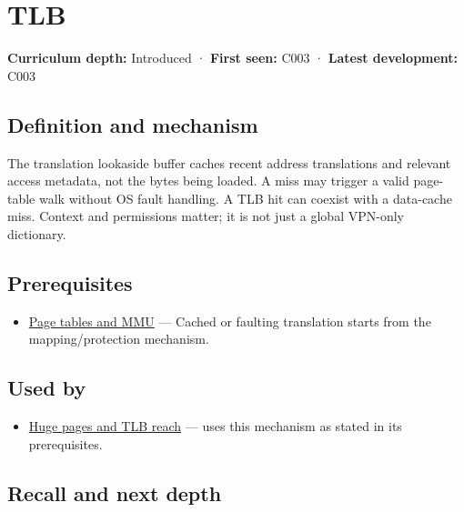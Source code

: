 \hypertarget{appendix-7a2d9c5ce511}{}\label{referencestart:appendix-7a2d9c5ce511}
\section{TLB}\label{appendix-7a2d9c5ce511-tlb}

\textbf{Curriculum depth:} Introduced · \textbf{First seen:} C003 · \textbf{Latest development:} C003

\subsection{Definition and mechanism}\label{appendix-7a2d9c5ce511-definition-and-mechanism}

The translation lookaside buffer caches recent address translations and relevant access metadata, not the bytes being loaded. A miss may trigger a valid page-table walk without OS fault handling. A TLB hit can coexist with a data-cache miss. Context and permissions matter; it is not just a global VPN-only dictionary.

\subsection{Prerequisites}\label{appendix-7a2d9c5ce511-prerequisites}

\begin{itemize}
\tightlist
\item
  \hyperref[appendix-01e5905165c4]{Page tables and MMU} --- Cached or faulting translation starts from the mapping/protection mechanism.
\end{itemize}

\subsection{Used by}\label{appendix-7a2d9c5ce511-used-by}

\begin{itemize}
\tightlist
\item
  \hyperref[appendix-ce688d1acdab]{Huge pages and TLB reach} --- uses this mechanism as stated in its prerequisites.
\end{itemize}

\subsection{Recall and next depth}\label{appendix-7a2d9c5ce511-recall-and-next-depth}

